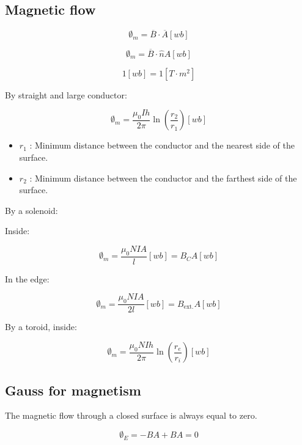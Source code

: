 \documentclass[letterpaper]{article}
\newcommand{\divline}{\noindent\makebox[\linewidth]{\rule{\textwidth}{0.4pt}}}
\begin{document}
    \begin{multicols}{2}
        \section{Magnetic flow}

        \[\emptyset_m = \overline{B} \cdot \overline{A} [wb]\]
        
        \[\emptyset_m = \overline{B} \cdot \hat{n} A [wb]\]

        \[1 [wb] = 1 [T \cdot m^2]\]

        By straight and large conductor:

        \[\emptyset_m = \frac{\mu_0 I h}{2 \pi} \ln{\left(\frac{r_2}{r_1}\right) [wb]}\]

        \begin{itemize}
            \item \(r_1\) : Minimum distance between the conductor and the nearest side of the surface.
            \item \(r_2\) : Minimum distance between the conductor and the farthest side of the surface.
        \end{itemize}

        By a solenoid:

        Inside:

        \[\emptyset_m = \frac{\mu_0 N I A}{l} [wb] = B_C A [wb]\]

        In the edge:

        \[\emptyset_m = \frac{\mu_0 N I A}{2 l} [wb] = B_{\text{ext.}} A [wb]\]

        By a toroid, inside:

        \[\emptyset_m = \frac{\mu_0 N I h}{2 \pi} \ln{\left( \frac{r_e}{r_i} \right)} [wb]\]
    \end{multicols}
    \divline
    
    \begin{multicols}{2}
        \section{Gauss for magnetism}

        The magnetic flow through a closed surface is always equal to zero.

        \[\emptyset_E = -BA + BA = 0\]
    \end{multicols}
    \divline
\end{document}
